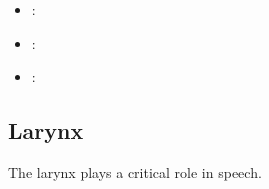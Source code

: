 \begin{multicols}{2}
\begin{itemize}
  \item {}:
  
  \begin{center}
  \end{center}

  \item {}:
  
  \begin{center}
  \end{center}
  
  \item {}:
  
  \begin{center}
  \end{center}
  
\end{itemize}
\end{multicols}

\subsection{Larynx}
The larynx plays a critical role in speech.

\begin{center}
\end{center}

